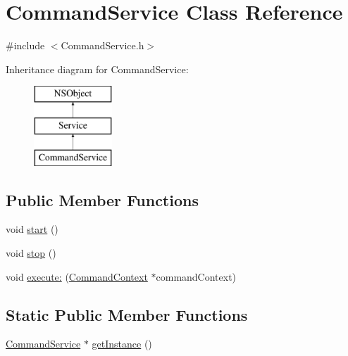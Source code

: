 \hypertarget{interface_command_service}{
\section{\-Command\-Service \-Class \-Reference}
\label{interface_command_service}
}


{\ttfamily \#include $<$\-Command\-Service.\-h$>$}

\-Inheritance diagram for \-Command\-Service\-:\begin{figure}[H]
\begin{center}
\leavevmode
\includegraphics[height=3.000000cm]{interface_command_service}
\end{center}
\end{figure}
\subsection*{\-Public \-Member \-Functions}
\begin{DoxyCompactItemize}
\item 
void \hyperlink{interface_command_service_aba03ffad968007c896457fe0b6743fcf}{start} ()
\item 
void \hyperlink{interface_command_service_a216bee3c8f8d6a3b2684627c1beee241}{stop} ()
\item 
void \hyperlink{interface_command_service_a9257f7f735ab4999662bd386477d8d77}{execute\-:} (\hyperlink{interface_command_context}{\-Command\-Context} $\ast$command\-Context)
\end{DoxyCompactItemize}
\subsection*{\-Static \-Public \-Member \-Functions}
\begin{DoxyCompactItemize}
\item 
\hyperlink{interface_command_service}{\-Command\-Service} $\ast$ \hyperlink{interface_command_service_a12423947ccf0cba3f82eb3f2e7f960ca}{get\-Instance} ()
\end{DoxyCompactItemize}


